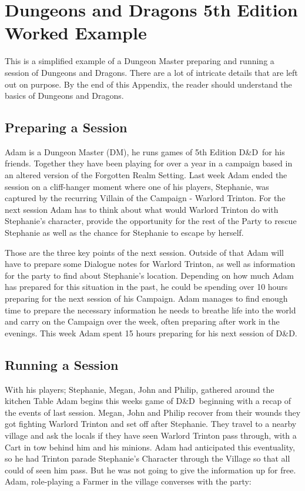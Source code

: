 \documentclass[review]{cmpreport}
\newcommand{\dnd}{D\&D}
\begin{document}
	\clearpage
	
	\section{Dungeons and Dragons 5th Edition Worked Example} \label{DnDExample}
	This is a simplified example of a Dungeon Master preparing and running a session of Dungeons and Dragons. There are a lot of intricate details that are left out on purpose. By the end of this Appendix, the reader should understand the basics of Dungeons and Dragons. 
	
	\subsection{Preparing a Session} \label{DnDPrepExample}
	Adam is a Dungeon Master (DM), he runs games of 5th Edition \dnd \ for his friends. Together they have been playing for over a year in a campaign based in an altered version of the Forgotten Realm Setting. Last week Adam ended the session on a cliff-hanger moment where one of his players, Stephanie, was captured by the recurring Villain of the Campaign - Warlord Trinton. For the next session Adam has to think about what would Warlord Trinton do with Stephanie's character, provide the opportunity for the rest of the Party to rescue Stephanie as well as the chance for Stephanie to escape by herself.
	
	Those are the three key points of the next session. Outside of that Adam will have to prepare some Dialogue notes for Warlord Trinton, as well as information for the party to find about Stephanie's location. Depending on how much Adam has prepared for this situation in the past, he could be spending over 10 hours preparing for the next session of his Campaign. Adam manages to find enough time to prepare the necessary information he needs to breathe life into the world and carry on the Campaign over the week, often preparing after work in the evenings. This week Adam spent 15 hours preparing for his next session of \dnd. 
	
	\subsection{Running a Session} \label{DnDSeshExample}
	With his players; Stephanie, Megan, John and Philip, gathered around the kitchen Table Adam begins this weeks game of \dnd \ beginning with a recap of the events of last session. Megan, John and Philip recover from their wounds they got fighting Warlord Trinton and set off after Stephanie. They travel to a nearby village and ask the locals if they have seen Warlord Trinton pass through, with a Cart in tow behind him and his minions. Adam had anticipated this eventuality, so he had Trinton parade Stephanie's Character through the Village so that all could of seen him pass. But he was not going to give the information up for free. Adam, role-playing a Farmer in the village converses with the party:
	
\end{document}
